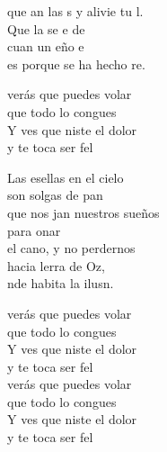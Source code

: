 \begin{cancion}
	que an las s y alivie tu l.\\
	Que la  se e de \\
	cuan un eño e\\
	es porque se ha hecho re.\\
	\begin{chorus}%
	verás que puedes volar\\
	que todo lo congues\\
	Y ves que niste el dolor \\
	y te toca ser fel\\
	\end{chorus}%
	Las esellas en el cielo\\
	son solgas de pan\\
	que nos jan nuestros sueños\\
	para onar\\
	el cano, y no perdernos\\
	hacia lerra de Oz,\\
	nde habita la ilusn. \\
	\begin{chorus}%
	verás que puedes volar\\
	que todo lo congues\\
	Y ves que niste el dolor \\
	y te toca ser fel\\
	verás que puedes volar\\
	que todo lo congues\\
	Y ves que niste el dolor \\
	y te toca ser fel\\
	\end{chorus}%
\end{cancion}%
